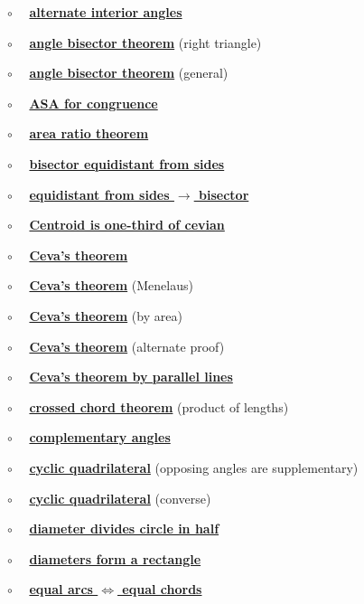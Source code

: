 \documentclass[11pt, oneside]{article}
\begin{document}
$\circ$ \ \  \hyperref[sec:alternate_interior_angle_theorem]{\textbf{alternate interior angles}}

$\circ$ \ \ \hyperref[sec:angle_bisector_theorem]{\textbf{angle bisector theorem}} (right triangle)

$\circ$ \ \ \hyperref[sec:generalized_angle_bisector_theorem]{\textbf{angle bisector theorem}} (general)

$\circ$ \ \ \hyperref[sec:ASA]{\textbf{ASA for congruence}}

$\circ$ \ \ \hyperref[sec:area_ratio_theorem]{\textbf{area ratio theorem}}

$\circ$ \ \ \hyperref[sec:bisector_equidistant_sides]{\textbf{bisector equidistant from sides}}

$\circ$ \ \ \hyperref[sec:bisector_equidistant_sides_converse]{\textbf{equidistant from sides $\rightarrow$ bisector}}

$\circ$ \ \ \hyperref[sec:centroid_one_third]{\textbf{Centroid is one-third of cevian}}

$\circ$ \ \ \hyperref[sec:Ceva_theorem]{\textbf{Ceva's theorem}}

$\circ$ \ \ \hyperref[sec:ceva_by_menlaus]{\textbf{Ceva's theorem}} (Menelaus)

$\circ$ \ \ \hyperref[sec:ceva_by_area]{\textbf{Ceva's theorem}} (by area)

$\circ$ \ \ \hyperref[sec:ceva_alternate_proof]{\textbf{Ceva's theorem}} (alternate proof)

$\circ$ \ \ \hyperref[sec:ceva_parallel_lines]{\textbf{Ceva's theorem by parallel lines}}

$\circ$ \ \ \hyperref[sec:Euclid_III_35]{\textbf{crossed chord theorem}} (product of lengths)

$\circ$ \ \ \hyperref[sec:complementary_angle_theorem]{\textbf{complementary angles}}

$\circ$ \ \ \hyperref[sec:quadrilateral_supplementary]{\textbf{cyclic quadrilateral}} (opposing angles are supplementary)

$\circ$ \ \ \hyperref[sec:inscribed_angles_converse]{\textbf{cyclic quadrilateral}} (converse)

$\circ$ \ \ \hyperref[sec:diameter_of_a_circle]{\textbf{diameter divides circle in half}}

$\circ$ \ \ \hyperref[sec:diameters_form_rectangle]{\textbf{diameters form a rectangle}}

$\circ$ \ \ \hyperref[sec:equal_arcs_equal_chords]{\textbf{equal arcs $\iff$ equal chords}}
\end{document}
